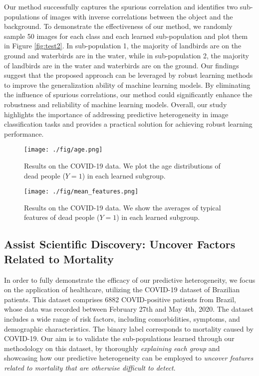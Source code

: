 Our method successfully captures the spurious correlation and identifies two sub-populations of images with inverse correlations between the object and the background.
To demonstrate the effectiveness of our method, we randomly sample 50 images for each class and each learned sub-population and plot them in Figure \ref{fig:test2}. 
In sub-population 1, the majority of landbirds are on the ground and waterbirds are in the water, while in sub-population 2, the majority of landbirds are in the water and waterbirds are on the ground.
Our findings suggest that the proposed approach can be leveraged by robust learning methods \citep{sagawa2019distributionally, koyama2020out} to improve the generalization ability of machine learning models. 
By eliminating the influence of spurious correlations, our method could significantly enhance the robustness and reliability of machine learning models. 
Overall, our study highlights the importance of addressing predictive heterogeneity in image classification tasks and provides a practical solution for achieving robust learning performance.


\begin{figure}[htbp]
\centering
\begin{minipage}{.48\textwidth}
  \centering
  \texttt{[image: ./fig/age.png]}
  \caption{Results on the COVID-19 data. We plot the age distributions of dead people ($Y=1$) in each learned subgroup.}
  \label{fig:COVID}
\end{minipage}%
\hfill
\begin{minipage}{.48\textwidth}
  \centering
  \texttt{[image: ./fig/mean\_features.png]}
  \caption{Results on the COVID-19 data. We show the averages of typical features of dead people ($Y=1$) in each learned subgroup.}
  \label{fig:COVID2}
\end{minipage}
\vskip -0.2in
\end{figure}



\subsection{Assist Scientific Discovery: Uncover Factors Related to Mortality}
In order to fully demonstrate the efficacy of our predictive heterogeneity, we focus on the application of healthcare, utilizing the COVID-19 dataset of Brazilian patients. 
This dataset comprises 6882 COVID-positive patients from Brazil, whose data was recorded between February 27th and May 4th, 2020. 
The dataset includes a wide range of risk factors, including comorbidities, symptoms, and demographic characteristics. 
The binary label corresponds to mortality caused by COVID-19. 
Our aim is to validate the sub-populations learned through our methodology on this dataset, by thoroughly \emph{explaining each group} and showcasing how our predictive heterogeneity can be employed to \emph{uncover features related to mortality that are otherwise difficult to detect}.

